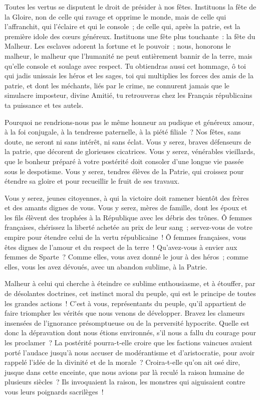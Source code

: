 \documentclass[french,twoside]{book} %
\begin{document}
Toutes les vertus se disputent le droit de présider à nos fêtes. Instituons la fête de la Gloire, non de celle qui ravage et opprime le monde, mais de celle qui l’affranchit, qui l’éclaire et qui le console ; de celle qui, après la patrie, est la première idole des cœurs généreux. Instituons une fête plus touchante : la fête du Malheur. Les esclaves adorent la fortune et le pouvoir ; nous, honorons le malheur, le malheur que l’humanité ne peut entièrement bannir de la terre, mais qu’elle console et soulage avec respect. Tu obtiendras aussi cet hommage, ô toi qui jadis unissais les héros et les sages, toi qui multiplies les forces des amis de la patrie, et dont les méchants, liés par le crime, ne connurent jamais que le simulacre imposteur, divine Amitié, tu retrouveras chez les Français républicains ta puissance et tes autels.\par
Pourquoi ne rendrions-nous pas le même honneur au pudique et généreux amour, à la foi conjugale, à la tendresse paternelle, à la piété filiale ? Nos fêtes, sans doute, ne seront ni sans intérêt, ni sans éclat. Vous y serez, braves défenseurs de la patrie, que décorent de glorieuses cicatrices. Vous y serez, vénérables vieillards, que le bonheur préparé à votre postérité doit consoler d’une longue vie passée sous le despotisme. Vous y serez, tendres élèves de la Patrie, qui croissez pour étendre sa gloire et pour recueillir le fruit de ses travaux.\par
Vous y serez, jeunes citoyennes, à qui la victoire doit ramener bientôt des frères et des amants dignes de vous. Vous y serez, mères de famille, dont les époux et les fils élèvent des trophées à la République avec les débris des trônes. Ô femmes françaises, chérissez la liberté achetée au prix de leur sang ; servez-vous de votre empire pour étendre celui de la vertu républicaine ! Ô femmes françaises, vous êtes dignes de l’amour et du respect de la terre ! Qu’avez-vous à envier aux femmes de Sparte ? Comme elles, vous avez donné le jour à des héros ; comme elles, vous les avez dévoués, avec un abandon sublime, à la Patrie.\par
Malheur à celui qui cherche à éteindre ce sublime enthousiasme, et à étouffer, par de désolantes doctrines, cet instinct moral du peuple, qui est le principe de toutes les grandes actions ! C’est à vous, représentants du peuple, qu’il appartient de faire triompher les vérités que nous venons de développer. Bravez les clameurs insensées de l’ignorance présomptueuse ou de la perversité hypocrite. Quelle est donc la dépravation dont nous étions environnés, s’il nous a fallu du courage pour les proclamer ? La postérité pourra-t-elle croire que les factions vaincues avaient porté l’audace jusqu’à nous accuser de modérantisme et d’aristocratie, pour avoir rappelé l’idée de la divinité et de la morale ? Croira-t-elle qu’on ait osé dire, jusque dans cette enceinte, que nous avions par là reculé la raison humaine de plusieurs siècles ? Ils invoquaient la raison, les monstres qui aiguisaient contre vous leurs poignards sacrilèges !\par
\end{document}
